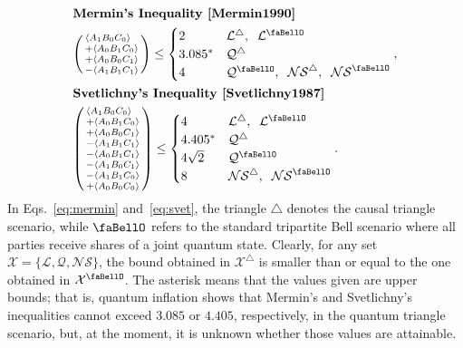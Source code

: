 \documentclass[superscriptaddress,aps,prx,nofootinbib,twocolumn,twoside,reprint,letterpaper,longbibliography]{revtex4-2}
\renewcommand{\bell}{\text{\faBellO}}
\renewcommand{\triangle}{\bigtriangleup}
\DeclarePairedDelimiter{\expec}{\langle}{\rangle}
\begin{document}
\begin{align}
\nonumber&\textbf{Mermin's Inequality~\cite{Mermin1990}}\\
	\label{eq:mermin}
	&\begin{psmallmatrix*}[l]
	\expec*{A_1 B_0 C_0}\\+\expec*{A_0 B_1 C_0}\\+\expec*{A_0 B_0 C_1}\\-\expec*{A_1 B_1 C_1}
	\end{psmallmatrix*}
	\leq \begin{cases}
		2 				& \mathcal{L}^\triangle,\;\;\mathcal{L}^\bell \\
		3.085^*		& \mathcal{Q}^\triangle \\
		4 & \mathcal{Q}^\bell,\;\;\mathcal{NS}^\triangle,\;\;\mathcal{NS}^\bell
	\end{cases},
\\\nonumber&\textbf{Svetlichny's Inequality~\cite{Svetlichny1987}}\\
	\label{eq:svet}
	&\begin{psmallmatrix*}[l]
	\expec*{A_1 B_0 C_0}\\+\expec*{A_0 B_1 C_0}\\+\expec*{A_0 B_0 C_1}\\-\expec*{A_1 B_1 C_1}\\
	-\expec*{A_0 B_1 C_1}\\-\expec*{A_1 B_0 C_1}\\-\expec*{A_1 B_1 C_0}\\+\expec*{A_0 B_0 C_0}
	\end{psmallmatrix*}
	\leq \begin{cases}
		4 				& \mathcal{L}^\triangle,\;\;\mathcal{L}^\bell\\
		4.405^* 	& \mathcal{Q}^\triangle \\
		4\sqrt{2} & \mathcal{Q}^\bell\\
		8 				& \mathcal{NS}^\triangle,\;\;\mathcal{NS}^\bell
	\end{cases}.
\end{align}
%
%
In Eqs.~\eqref{eq:mermin} and~\eqref{eq:svet}, the triangle $\triangle$ denotes the causal triangle scenario, while $\bell$ refers to the standard tripartite Bell scenario where all parties receive shares of a joint quantum state. Clearly, for any set $\mathcal X=\{\mathcal L, \mathcal Q, \mathcal{NS}\}$, the bound obtained in $\mathcal X^{\triangle}$ is smaller than or equal to the one obtained in $\mathcal X^{\bell}$. The asterisk means that the values given are upper bounds; that is, quantum inflation shows that Mermin's and Svetlichny's inequalities cannot exceed $3.085$ or $4.405$, respectively, in the quantum triangle scenario, but, at the moment, it is unknown whether those values are attainable.
\end{document}
